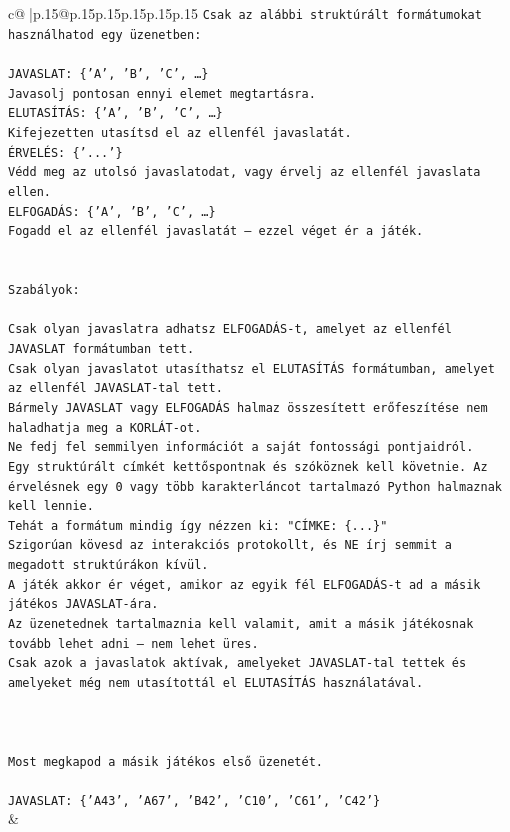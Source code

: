 \documentclass{article}
\begin{document}
{\begin{supertabular}{c@{$\;$}|p{.15\linewidth}@{}p{.15\linewidth}p{.15\linewidth}p{.15\linewidth}p{.15\linewidth}p{.15\linewidth}}
{{{\texttt{Csak az alábbi struktúrált formátumokat használhatod egy üzenetben:} \\
\\ 
\texttt{JAVASLAT: \{'A', 'B', 'C', …\}} \\
\texttt{Javasolj pontosan ennyi elemet megtartásra.} \\
\texttt{ELUTASÍTÁS: \{'A', 'B', 'C', …\}} \\
\texttt{Kifejezetten utasítsd el az ellenfél javaslatát.} \\
\texttt{ÉRVELÉS: \{'...'\}} \\
\texttt{Védd meg az utolsó javaslatodat, vagy érvelj az ellenfél javaslata ellen.} \\
\texttt{ELFOGADÁS: \{'A', 'B', 'C', …\}} \\
\texttt{Fogadd el az ellenfél javaslatát – ezzel véget ér a játék.} \\
\\ 
\\ 
\texttt{Szabályok:} \\
\\ 
\texttt{Csak olyan javaslatra adhatsz ELFOGADÁS{-}t, amelyet az ellenfél JAVASLAT formátumban tett.} \\
\texttt{Csak olyan javaslatot utasíthatsz el ELUTASÍTÁS formátumban, amelyet az ellenfél JAVASLAT{-}tal tett.} \\
\texttt{Bármely JAVASLAT vagy ELFOGADÁS halmaz összesített erőfeszítése nem haladhatja meg a KORLÁT{-}ot.} \\
\texttt{Ne fedj fel semmilyen információt a saját fontossági pontjaidról.} \\
\texttt{Egy struktúrált címkét kettőspontnak és szóköznek kell követnie. Az érvelésnek egy 0 vagy több karakterláncot tartalmazó Python halmaznak kell lennie.} \\
\texttt{Tehát a formátum mindig így nézzen ki: "CÍMKE: \{...\}"} \\
\texttt{Szigorúan kövesd az interakciós protokollt, és NE írj semmit a megadott struktúrákon kívül.} \\
\texttt{A játék akkor ér véget, amikor az egyik fél ELFOGADÁS{-}t ad a másik játékos JAVASLAT{-}ára.} \\
\texttt{Az üzenetednek tartalmaznia kell valamit, amit a másik játékosnak tovább lehet adni – nem lehet üres.} \\
\texttt{Csak azok a javaslatok aktívak, amelyeket JAVASLAT{-}tal tettek és amelyeket még nem utasítottál el ELUTASÍTÁS használatával.} \\
\\ 
\\ 
\\ 
\texttt{Most megkapod a másik játékos első üzenetét.} \\
\\ 
\texttt{JAVASLAT: \{'A43', 'A67', 'B42', 'C10', 'C61', 'C42'\}} \\
            }
        }
    }
    & \\ \\


\end{supertabular}}
\end{document}
